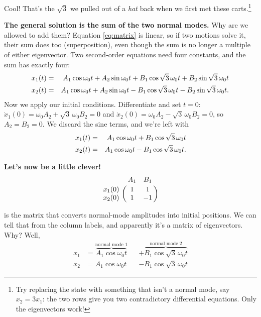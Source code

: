 \documentclass[12pt]{article}
\numberwithin{equation}{section}
\newcommand{\wo}{\omega_0}
\begin{document}
Cool! That's the $\sqrt{3}$ we pulled out of a \textit{hat} back when we first met these
carts.\footnote{Try replacing the state with something that isn't a normal mode,
say $x_2 = 3x_1$: the two rows give you two contradictory differential
equations. Only the eigenvectors work!}

\medskip
\noindent\textbf{The general solution is the sum of the two normal
modes.} Why are we allowed to add them? Equation \eqref{eq:matrix} is
linear, so if two motions solve it, their sum does too (superposition),
even though the sum is no longer a multiple of either eigenvector. Two
second-order equations need four constants, and the sum has exactly four:
\begin{eqnarray}
  \label{eq:foursum}
  x_1(t) &=& A_1\cos\wo t + A_2\sin\wo t + B_1\cos\sqrt{3}\,\wo t + B_2\sin\sqrt{3}\,\wo t \\
  x_2(t) &=& A_1\cos\wo t + A_2\sin\wo t - B_1\cos\sqrt{3}\,\wo t - B_2\sin\sqrt{3}\,\wo t . \notag
\end{eqnarray}
Now we apply our initial conditions. Differentiate and set $t = 0$:
$\dot{x}_1(0) = \wo A_2 + \sqrt{3}\,\wo B_2 = 0$ and $\dot{x}_2(0) = \wo
A_2 - \sqrt{3}\,\wo B_2 = 0$, so $A_2 = B_2 = 0$. We discard the sine
terms, and we're left with
\begin{eqnarray}
  \label{eq:sum}
  x_1(t) &=& A_1\cos\wo t + B_1\cos\sqrt{3}\,\wo t \\
  x_2(t) &=& A_1\cos\wo t - B_1\cos\sqrt{3}\,\wo t . \notag
\end{eqnarray}

\medskip

\noindent\textbf{Let's now be a little clever!}
\begin{equation}
  \label{eq:P}
  \lmat{A_1}{B_1}{x_1(0)}{x_2(0)}{1}{1}{1}{-1}
\end{equation}

\noindent is the matrix that converts normal-mode amplitudes into initial
positions. We can tell that from the column labels, and apparently it's a
matrix of eigenvectors. Why? Well,
\begin{equation}
  \begin{aligned}
    x_1 &= \overbrace{A_1\cos\wo t}^{\text{normal mode 1}}
        &&+ \overbrace{B_1\cos\sqrt{3}\,\wo t}^{\text{normal mode 2}} \\
    x_2 &= A_1\cos\wo t &&- B_1\cos\sqrt{3}\,\wo t
  \end{aligned}
\end{equation}
\end{document}
